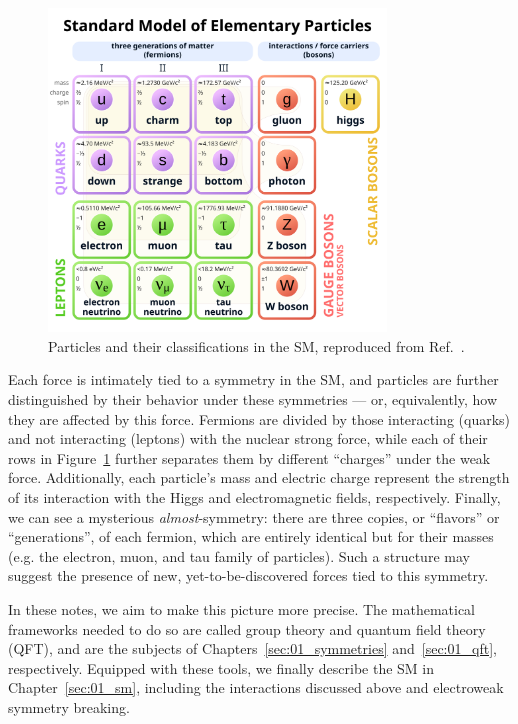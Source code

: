 \begin{figure}[ht!]
	\centering
	\includegraphics[width=0.8\textwidth]{figures/01-SM/sm_diagram.png}
	\caption{Particles and their classifications in the SM, reproduced from Ref.~\cite{enwiki:1238968997}.}
	\label{fig:01_sm}
\end{figure}

Each force is intimately tied to a symmetry in the SM, and particles are further distinguished by their behavior under these symmetries --- or, equivalently, how they are affected by this force.
Fermions are divided by those interacting (quarks) and not interacting (leptons) with the nuclear strong force, while each of their rows in Figure~\ref{fig:01_sm} further separates them by different ``charges'' under the weak force.
Additionally, each particle's mass and electric charge represent the strength of its interaction with the Higgs and electromagnetic fields, respectively.
Finally, we can see a mysterious \textit{almost}-symmetry: there are three copies, or ``flavors'' or ``generations'', of each fermion, which are entirely identical but for their masses (e.g. the electron, muon, and tau family of particles).
Such a structure may suggest the presence of new, yet-to-be-discovered forces tied to this symmetry.

In these notes, we aim to make this picture more precise.
The mathematical frameworks needed to do so are called group theory and quantum field theory (QFT), and are the subjects of Chapters~\ref{sec:01_symmetries} and~\ref{sec:01_qft}, respectively.
Equipped with these tools, we finally describe the SM in Chapter~\ref{sec:01_sm}, including the interactions discussed above and electroweak symmetry breaking.

